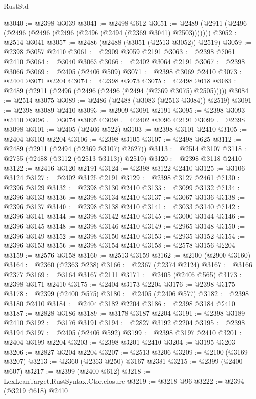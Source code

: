 \begin{lexlean}{RustStd}
\begin{coremodule}
{\begin{coremodule}
{{{{{{{{{{{{{{{{{{{{{{{{{{{{{{{{{{{{{{{{{{{{{{{{{{@3040 := @2398 @3039
@3041 := @2498 @612
@3051 := @2489 (@2911 (@2496 (@2496 (@2496 (@2496 (@2496 (@2494 (@2369 @3041) @2503)))))))
@3052 := @2514 @3041
@3057 := @2486 (@2488 (@3051 (@2513 @3052)) @2519)
@3059 := @2398 @3057 @2410
@3061 := @2909 @3059 @2191
@3063 := @2398 @3061 @2410
@3064 := @3040 @3063
@3066 := @2402 @3064 @2191
@3067 := @2398 @3066
@3069 := @2405 (@2406 @509)
@3071 := @2398 @3069 @2410
@3073 := @2404 @3071 @2204
@3074 := @2398 @3073
@3075 := @2498 @618
@3083 := @2489 (@2911 (@2496 (@2496 (@2496 (@2494 (@2369 @3075) @2505)))))
@3084 := @2514 @3075
@3089 := @2486 (@2488 (@3083 (@2513 @3084)) @2519)
@3091 := @2398 @3089 @2410
@3093 := @2909 @3091 @2191
@3095 := @2398 @3093 @2410
@3096 := @3074 @3095
@3098 := @2402 @3096 @2191
@3099 := @2398 @3098
@3101 := @2405 (@2406 @522)
@3103 := @2398 @3101 @2410
@3105 := @2404 @3103 @2204
@3106 := @2398 @3105
@3107 := @2498 @625
@3112 := @2489 (@2911 (@2494 (@2369 @3107) @2627))
@3113 := @2514 @3107
@3118 := @2755 (@2488 (@3112 (@2513 @3113)) @2519)
@3120 := @2398 @3118 @2410
@3122 := @2416 @3120 @2191
@3124 := @2398 @3122 @2410
@3125 := @3106 @3124
@3127 := @2402 @3125 @2191
@3129 := @2398 @3127 @2461
@3130 := @2396 @3129
@3132 := @2398 @3130 @2410
@3133 := @3099 @3132
@3134 := @2396 @3133
@3136 := @2398 @3134 @2410
@3137 := @3067 @3136
@3138 := @2396 @3137
@3140 := @2398 @3138 @2410
@3141 := @3033 @3140
@3142 := @2396 @3141
@3144 := @2398 @3142 @2410
@3145 := @3000 @3144
@3146 := @2396 @3145
@3148 := @2398 @3146 @2410
@3149 := @2965 @3148
@3150 := @2396 @3149
@3152 := @2398 @3150 @2410
@3153 := @2935 @3152
@3154 := @2396 @3153
@3156 := @2398 @3154 @2410
@3158 := @2578 @3156 @2204
@3159 := @2576 @3158
@3160 := @2513 @3159
@3162 := @2100 (@2900 @3160)
@3164 := @2360 (@2363 @238)
@3166 := @2367 (@2374 @2124)
@3167 := @3166 @2377
@3169 := @3164 @3167 @2111
@3171 := @2405 (@2406 @565)
@3173 := @2398 @3171 @2410
@3175 := @2404 @3173 @2204
@3176 := @2398 @3175
@3178 := @2399 (@2400 @575)
@3180 := @2405 (@2406 @577)
@3182 := @2398 @3180 @2410
@3184 := @2404 @3182 @2204
@3186 := @2398 @3184 @2410
@3187 := @2828 @3186
@3189 := @3178 @3187 @2204
@3191 := @2398 @3189 @2410
@3192 := @3176 @3191
@3194 := @2827 @3192 @2204
@3195 := @2398 @3194
@3197 := @2405 (@2406 @592)
@3199 := @2398 @3197 @2410
@3201 := @2404 @3199 @2204
@3203 := @2398 @3201 @2410
@3204 := @3195 @3203
@3206 := @2827 @3204 @2204
@3207 := @2513 @3206
@3209 := @2100 (@3169 @3207)
@3213 := @2360 (@2363 @250) @3167 @2381
@3215 := @2399 (@2400 @607)
@3217 := @2399 (@2400 @612)
@3218 := LexLeanTarget.RustSyntax.Ctor.closure
@3219 := @3218 @96
@3222 := @2394 (@3219 @618) @2410
}}}}}}}}}}}}}}}}}}}}}}}}}}}}}}}}}}}}}}}}}}}}}}}}}}
\end{coremodule}}
\end{coremodule}
\end{lexlean}
